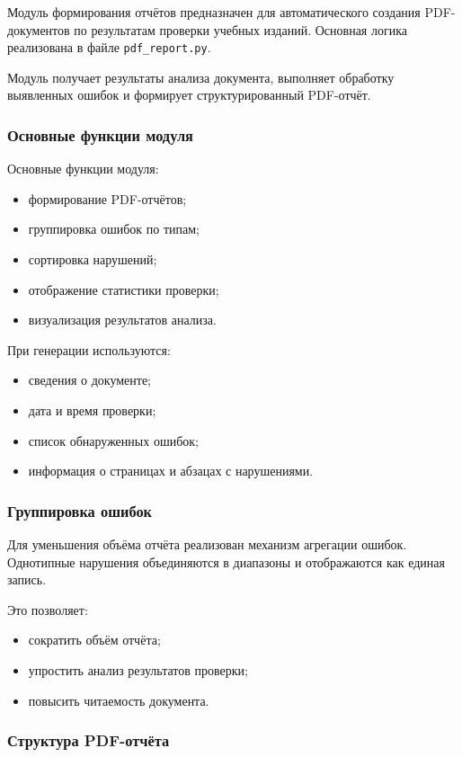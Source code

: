 Модуль формирования отчётов предназначен для автоматического создания PDF-документов по результатам проверки учебных изданий. Основная логика реализована в файле \texttt{pdf\_report.py}.

Модуль получает результаты анализа документа, выполняет обработку выявленных ошибок и формирует структурированный PDF-отчёт.

\subsubsection{Основные функции модуля}

Основные функции модуля:
\begin{itemize}
	\item формирование PDF-отчётов;
	\item группировка ошибок по типам;
	\item сортировка нарушений;
	\item отображение статистики проверки;
	\item визуализация результатов анализа.
\end{itemize}

При генерации используются:
\begin{itemize}
	\item сведения о документе;
	\item дата и время проверки;
	\item список обнаруженных ошибок;
	\item информация о страницах и абзацах с нарушениями.
\end{itemize}

\subsubsection{Группировка ошибок}

Для уменьшения объёма отчёта реализован механизм агрегации ошибок. Однотипные нарушения объединяются в диапазоны и отображаются как единая запись.

Это позволяет:
\begin{itemize}
	\item сократить объём отчёта;
	\item упростить анализ результатов проверки;
	\item повысить читаемость документа.
\end{itemize}

\subsubsection{Структура PDF-отчёта}

